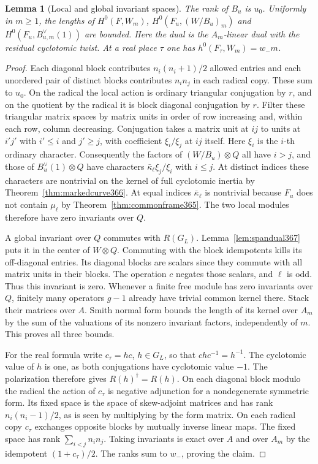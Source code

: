 \documentclass[a4paper,11pt]{article}
\newtheorem{lemma}[proposition]{Lemma}
\theoremstyle{definition}
\theoremstyle{remark}
\numberwithin{equation}{section}
\begin{document}
\begin{lemma}[Local and global invariant spaces]
\label{lem:localranks368}
The rank of \(B_u\) is \(u_0\). Uniformly in \(m\ge1\), the
lengths of \(H^0(F,W_m)\), \(H^0(F_u,(W/B_u)_m)\) and
\(H^0(F_u,B_{u,m}^{\vee}(1))\) are bounded. Here the dual
is the \(A_m\)-linear dual with the residual cyclotomic twist.
At a real place \(\tau\) one has \(h^0(F_\tau,W_m)=w_-m\).
\end{lemma}
\begin{proof}
Each diagonal block contributes \(n_i(n_i+1)/2\) allowed entries
and each unordered pair of distinct blocks contributes \(n_i n_j\)
in each radical copy. These sum to \(u_0\).
On the radical the local action is ordinary triangular
conjugation by \(r\), and on the quotient by the radical it
is block diagonal conjugation by \(r\). Filter these triangular
matrix spaces by matrix units in order of row increasing and,
within each row, column decreasing. Conjugation takes a
matrix unit at \(ij\) to units at \(i'j'\) with \(i'\le i\)
and \(j'\ge j\), with coefficient \(\xi_i/\xi_j\) at \(ij\)
itself. Here \(\xi_i\) is the \(i\)-th ordinary character.
Consequently the factors of \((W/B_u)\otimes Q\) all have
\(i>j\), and those of \(B_u^\vee(1)\otimes Q\) have characters
\(\bar\kappa_\ell\xi_j/\xi_i\) with \(i\le j\).
At distinct indices these characters are nontrivial on the
kernel of full cyclotomic inertia by
Theorem~\ref{thm:markedcurve366}. At equal indices
\(\bar\kappa_\ell\) is nontrivial because \(F_u\) does not
contain \(\mu_\ell\) by Theorem~\ref{thm:commonframe365}.
The two local modules therefore have zero invariants over \(Q\).

A global invariant over \(Q\) commutes with \(R(G_L)\).
Lemma~\ref{lem:spandual367} puts it in the center of \(W\otimes Q\).
Commuting with the block idempotents kills its off-diagonal
entries. Its diagonal blocks are scalars since they commute
with all matrix units in their blocks. The operation \(c\)
negates those scalars, and \(\ell\) is odd. Thus this invariant
is zero. Whenever a finite free module has zero invariants over
\(Q\), finitely many operators \(g-1\) already have trivial
common kernel there. Stack their matrices over \(A\).
Smith normal form bounds the length of its kernel over \(A_m\)
by the sum of the valuations of its nonzero invariant factors,
independently of \(m\). This proves all three bounds.

For the real formula write \(c_\tau=hc\), \(h\in G_L\), so that
\(chc^{-1}=h^{-1}\). The cyclotomic value of \(h\) is one, as
both conjugations have cyclotomic value \(-1\). The polarization
therefore gives \(R(h)^\dagger=R(h)\). On each diagonal block
modulo the radical the action of \(c_\tau\) is negative
adjunction for a nondegenerate symmetric form. Its fixed space
is the space of skew-adjoint matrices and has rank
\(n_i(n_i-1)/2\), as is seen by multiplying by the form matrix.
On each radical copy \(c_\tau\) exchanges opposite blocks by
mutually inverse linear maps. The fixed space has rank
\(\sum_{i<j}n_i n_j\). Taking invariants is exact over \(A\)
and over \(A_m\) by the idempotent \((1+c_\tau)/2\).
The ranks sum to \(w_-\), proving the claim.
\end{proof}
\end{document}
